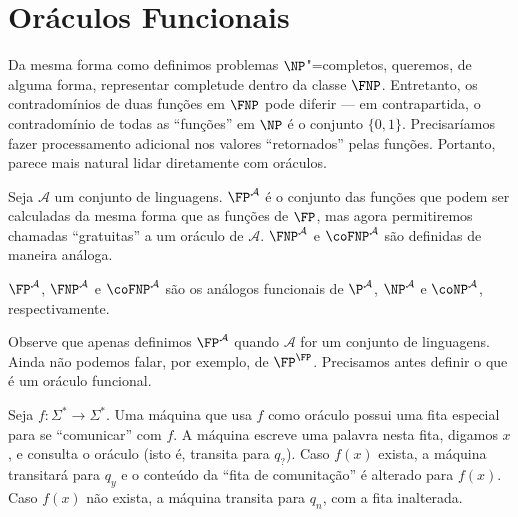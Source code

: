 \section{Oráculos Funcionais}

Da mesma forma como definimos problemas $\NP$"=completos,
queremos, de alguma forma,
representar completude dentro da classe $\FNP$.
Entretanto,
os contradomínios de duas funções em $\FNP$ pode diferir
--- em contrapartida,
o contradomínio de todas as ``funções'' em $\NP$ é o conjunto $\{0, 1\}$.
Precisaríamos fazer processamento adicional
nos valores ``retornados'' pelas funções.
Portanto,
parece mais natural lidar diretamente com oráculos.

\begin{definition}
    Seja $\mathcal A$ um conjunto de linguagens.
    $\FP^\mathcal A$ é o conjunto das funções
    que podem ser calculadas da mesma forma que as funções de $\FP$,
    mas agora permitiremos chamadas ``gratuitas'' a um oráculo de $\mathcal A$.
    $\FNP^\mathcal A$ e $\coFNP^\mathcal A$
    são definidas de maneira análoga.
\end{definition}

$\FP^\mathcal A$, $\FNP^\mathcal A$ e $\coFNP^\mathcal A$
são os análogos funcionais de
$\P^\mathcal A$, $\NP^\mathcal A$ e $\coNP^\mathcal A$,
respectivamente.

Observe que apenas definimos $\FP^\mathcal A$
quando $\mathcal A$ for um conjunto de linguagens.
Ainda não podemos falar, por exemplo, de $\FP^\FP$.
Precisamos antes definir o que é um oráculo funcional.

\begin{definition}
    Seja $f : \Sigma^* \rightarrow \Sigma^*$.
    Uma máquina que usa $f$ como oráculo
    possui uma fita especial para se ``comunicar'' com $f$.
    A máquina escreve uma palavra nesta fita,
    digamos $x$,
    e consulta o oráculo
    (isto é, transita para $q_?$).
    Caso $f(x)$ exista,
    a máquina transitará para $q_y$
    e o conteúdo da ``fita de comunitação'' é alterado para $f(x)$.
    Caso $f(x)$ não exista,
    a máquina transita para $q_n$,
    com a fita inalterada.
\end{definition}
